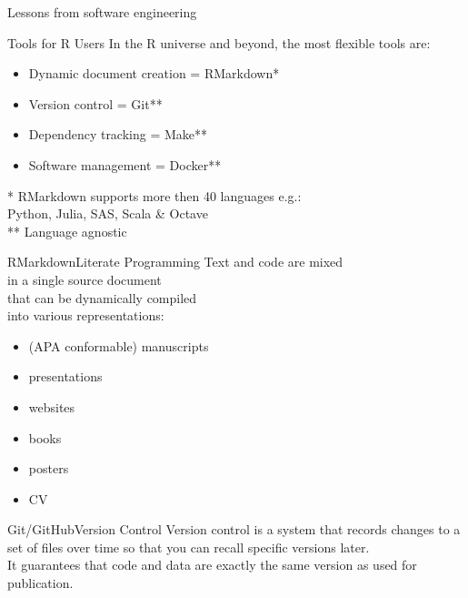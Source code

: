 \documentclass[12pt,t]{beamer}
\begin{document}
{\begin{frame}[c]{Lessons from software engineering}
\end{frame}

\begin{frame}[c]{Tools for R Users}
	In the R universe and beyond, the most flexible tools are:
  \begin{itemize}
    \item Dynamic document creation = RMarkdown*
    \item Version control = Git**
    \item Dependency tracking = Make**
    \item Software management = Docker**
  \end{itemize}
  \vfill
  \textcolor{lolit}{
	* RMarkdown supports more then 40 languages e.g.:\\
	\hspace{10mm}Python, Julia, SAS, Scala \& Octave\\
	** Language agnostic
	}
\end{frame}

\begin{frame}[c]{RMarkdown\textemdash{}Literate Programming}
  Text and code are mixed\\
  in a single source document\\
  that can be \textcolor{hilit}{dynamically} compiled\\
  into various representations:
  \begin{itemize}
    \item (APA conformable) manuscripts
    \item presentations
    \item websites
    \item books
    \item posters
		\item CV
  \end{itemize}
\end{frame}

{
  \begin{frame}[plain]
  \end{frame}
}
{
  \begin{frame}[plain]
  \end{frame}
}
\begin{frame}[c]{Git/GitHub\textemdash{}Version Control}
  Version control is a system that records changes to a set of files
  over time so that you can recall specific versions later.\\
  \vspace{10mm}
  It guarantees that code and data are exactly the same version as used for
  publication.
\end{frame}

}
\end{document}
